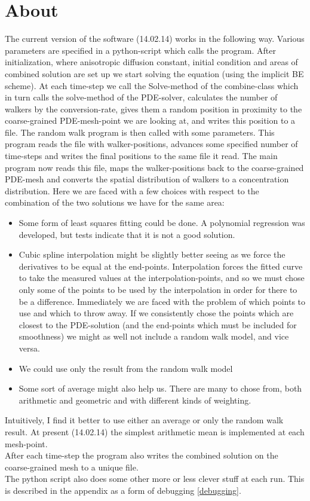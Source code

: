 \section{About}\label{Software:About}
The current version of the software (14.02.14) works in the following way. 
Various parameters are specified in a python-script which calls the program. 
After initialization, where anisotropic diffusion constant, initial condition and areas of combined solution are set up we start solving the equation (using the implicit BE scheme). 
At each time-step we call the Solve-method of the combine-class which in turn calls the solve-method of the PDE-solver, calculates the number of walkers by the conversion-rate, gives them a random position in proximity to the coarse-grained PDE-mesh-point we are looking at, and writes this position to a file. 
The random walk program is then called with some parameters. This program reads the file with walker-positions, advances some specified number of time-steps and writes the final positions to the same file it read. 
The main program now reads this file, maps the walker-positions back to the coarse-grained PDE-mesh and converts the spatial distribution of walkers to a concentration distribution. 
Here we are faced with a few choices with respect to the combination of the two solutions we have for the same area: 
\begin{itemize}
 \item Some form of least squares fitting could be done. A polynomial regression was developed, but tests indicate that it is not a good solution.
 \item Cubic spline interpolation might be slightly better seeing as we force the derivatives to be equal at the end-points. 
 Interpolation forces the fitted curve to take the measured values at the interpolation-points, and so we must chose only some of the points to be used by the interpolation in order for there to be a difference. Immediately we are faced with the problem of which points to use and which to throw away. If we consistently chose the points which are closest to the PDE-solution (and the end-points which must be included for smoothness) we might as well not include a random walk model, and vice versa.
 \item We could use only the result from the random walk model
 \item Some sort of average might also help us. There are many to chose from, both arithmetic and geometric and with different kinds of weighting.
\end{itemize}
Intuitively, I find it better to use either an average or only the random walk result. At present (14.02.14) the simplest arithmetic mean is implemented at each mesh-point.\\
After each time-step the program also writes the combined solution on the coarse-grained mesh to a unique file.\\
The python script also does some other more or less clever stuff at each run. This is described in the appendix as a form of debugging \ref{debugging}.

